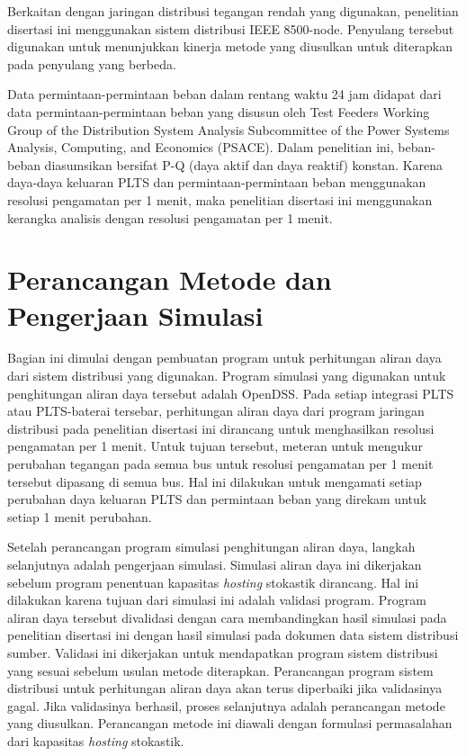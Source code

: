 Berkaitan dengan jaringan distribusi tegangan rendah yang digunakan, penelitian disertasi ini menggunakan sistem distribusi  IEEE 8500-node. Penyulang tersebut digunakan untuk menunjukkan kinerja metode yang diusulkan untuk diterapkan pada penyulang yang berbeda. 

Data permintaan-permintaan beban dalam rentang waktu 24 jam didapat dari data permintaan-permintaan beban yang disusun oleh Test Feeders Working Group of the Distribution System Analysis Subcommittee of the Power Systems Analysis, Computing, and Economics (PSACE). Dalam penelitian ini, beban-beban diasumsikan bersifat P-Q (daya aktif dan daya reaktif) konstan. Karena daya-daya keluaran PLTS dan permintaan-permintaan beban menggunakan resolusi pengamatan per 1 menit, maka penelitian disertasi ini menggunakan kerangka analisis dengan resolusi pengamatan per 1 menit.

\section{Perancangan Metode dan Pengerjaan Simulasi}
Bagian ini dimulai dengan pembuatan program untuk perhitungan aliran daya dari sistem distribusi yang digunakan. Program simulasi yang digunakan untuk penghitungan aliran daya tersebut adalah OpenDSS. Pada setiap integrasi PLTS atau PLTS-baterai tersebar, perhitungan aliran daya dari program jaringan distribusi pada penelitian disertasi ini dirancang untuk menghasilkan resolusi pengamatan per 1 menit. Untuk tujuan tersebut, meteran untuk mengukur perubahan tegangan pada semua bus untuk resolusi pengamatan per 1 menit tersebut dipasang di semua bus. Hal ini dilakukan untuk mengamati setiap perubahan daya keluaran PLTS dan permintaan beban yang direkam untuk setiap 1 menit perubahan.

Setelah perancangan program simulasi penghitungan aliran daya, langkah selanjutnya adalah pengerjaan simulasi. Simulasi aliran daya ini dikerjakan sebelum program penentuan kapasitas \textit{\textit{hosting}} stokastik dirancang. Hal ini dilakukan karena tujuan dari simulasi ini adalah validasi program. Program aliran daya tersebut divalidasi dengan cara membandingkan hasil simulasi pada penelitian disertasi ini dengan hasil simulasi pada dokumen data sistem distribusi sumber. Validasi ini dikerjakan untuk mendapatkan program sistem distribusi yang sesuai sebelum usulan metode diterapkan. Perancangan program sistem distribusi untuk perhitungan aliran daya akan terus diperbaiki jika validasinya gagal. Jika validasinya berhasil, proses selanjutnya adalah perancangan metode yang diusulkan. Perancangan metode ini diawali dengan formulasi permasalahan dari kapasitas \textit{\textit{hosting}} stokastik.

